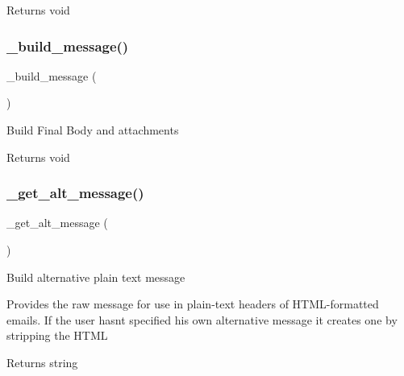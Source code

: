 \begin{DoxyReturn}{Returns}
void 
\end{DoxyReturn}
\mbox{\label{class_c_i___email_a9ddc60e529eb909ff0879781a6f296ff}} 
\subsubsection{\texorpdfstring{\+\_\+build\+\_\+message()}{\_build\_message()}}
{\footnotesize\ttfamily \+\_\+build\+\_\+message (\begin{DoxyParamCaption}{ }\end{DoxyParamCaption})\hspace{0.3cm}{\ttfamily [protected]}}

Build Final Body and attachments

\begin{DoxyReturn}{Returns}
void 
\end{DoxyReturn}
\mbox{\label{class_c_i___email_a1a87461e94ab7466b7b6f22682c4a055}} 
\subsubsection{\texorpdfstring{\+\_\+get\+\_\+alt\+\_\+message()}{\_get\_alt\_message()}}
{\footnotesize\ttfamily \+\_\+get\+\_\+alt\+\_\+message (\begin{DoxyParamCaption}{ }\end{DoxyParamCaption})\hspace{0.3cm}{\ttfamily [protected]}}

Build alternative plain text message

Provides the raw message for use in plain-\/text headers of H\+T\+M\+L-\/formatted emails. If the user hasn\textquotesingle{}t specified his own alternative message it creates one by stripping the H\+T\+ML

\begin{DoxyReturn}{Returns}
string 
\end{DoxyReturn}
\mbox{\label{class_c_i___email_a0df0801e489187b9f8108ec776f98f2e}} 
